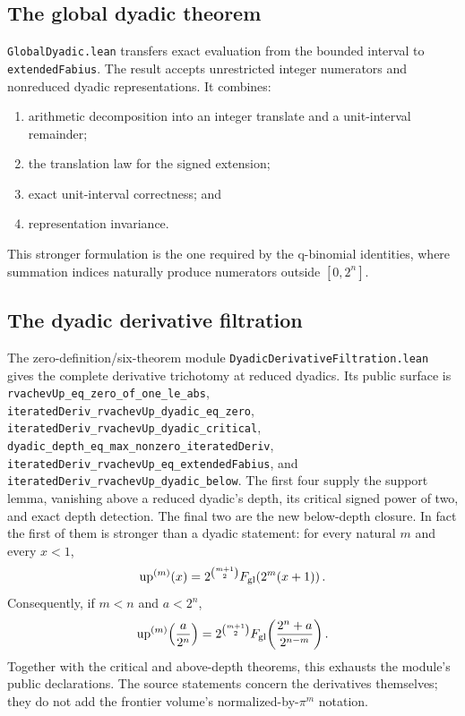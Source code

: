\documentclass[11pt,oneside]{article}
\theoremstyle{definition}
\theoremstyle{remark}
\begin{document}
\subsection{The global dyadic theorem}
\nolinkurl{GlobalDyadic.lean} transfers exact evaluation from the bounded interval to \nolinkurl{extendedFabius}.  The result accepts unrestricted integer numerators and nonreduced dyadic representations.  It combines:
\begin{enumerate}
  \item arithmetic decomposition into an integer translate and a unit-interval remainder;
  \item the translation law for the signed extension;
  \item exact unit-interval correctness; and
  \item representation invariance.
\end{enumerate}
This stronger formulation is the one required by the q-binomial identities, where summation indices naturally produce numerators outside \([0,2^n]\).

\subsection{The dyadic derivative filtration}
The zero-definition/six-theorem module
\nolinkurl{DyadicDerivativeFiltration.lean} gives the complete derivative
trichotomy at reduced dyadics.  Its public surface is
\nolinkurl{rvachevUp_eq_zero_of_one_le_abs},
\nolinkurl{iteratedDeriv_rvachevUp_dyadic_eq_zero},
\nolinkurl{iteratedDeriv_rvachevUp_dyadic_critical},
\nolinkurl{dyadic_depth_eq_max_nonzero_iteratedDeriv},
\nolinkurl{iteratedDeriv_rvachevUp_eq_extendedFabius}, and
\nolinkurl{iteratedDeriv_rvachevUp_dyadic_below}.  The first four supply the
support lemma, vanishing above a reduced dyadic's depth, its critical signed
power of two, and exact depth detection.  The final two are the new
below-depth closure.  In fact the first of them is stronger than a dyadic
statement: for every natural \(m\) and every \(x<1\),
\[
 \operatorname{up}^{(m)}(x)
 =2^{\binom{m+1}{2}}F_{\mathrm{gl}}\!\left(2^m(x+1)\right).
\]
Consequently, if \(m<n\) and \(a<2^n\),
\[
 \operatorname{up}^{(m)}\!\left(\frac a{2^n}\right)
 =2^{\binom{m+1}{2}}F_{\mathrm{gl}}\!\left(\frac{2^n+a}{2^{n-m}}\right).
\]
Together with the critical and above-depth theorems, this exhausts the
module's public declarations.  The source statements concern the derivatives
themselves; they do not add the frontier volume's normalized-by-\(\pi^m\)
notation.
\end{document}
